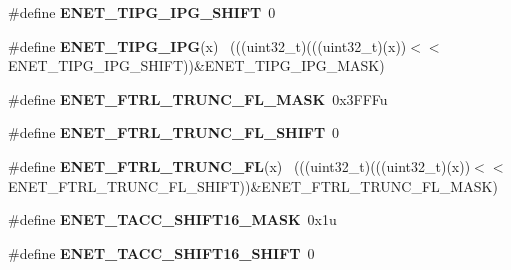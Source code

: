 \begin{DoxyCompactItemize}
\item 
\hypertarget{group___e_n_e_t___register___masks_gabab61fb9b318b0019d086418cc90f1f7}{}\#define {\bfseries E\+N\+E\+T\+\_\+\+T\+I\+P\+G\+\_\+\+I\+P\+G\+\_\+\+S\+H\+I\+F\+T}~0\label{group___e_n_e_t___register___masks_gabab61fb9b318b0019d086418cc90f1f7}

\item 
\hypertarget{group___e_n_e_t___register___masks_ga2660bb65651046d496b57ec5bcd298dd}{}\#define {\bfseries E\+N\+E\+T\+\_\+\+T\+I\+P\+G\+\_\+\+I\+P\+G}(x)                                              ~(((uint32\+\_\+t)(((uint32\+\_\+t)(x))$<$$<$E\+N\+E\+T\+\_\+\+T\+I\+P\+G\+\_\+\+I\+P\+G\+\_\+\+S\+H\+I\+F\+T))\&E\+N\+E\+T\+\_\+\+T\+I\+P\+G\+\_\+\+I\+P\+G\+\_\+\+M\+A\+S\+K)\label{group___e_n_e_t___register___masks_ga2660bb65651046d496b57ec5bcd298dd}

\item 
\hypertarget{group___e_n_e_t___register___masks_ga05457257c070632d99a2691b0859b4a9}{}\#define {\bfseries E\+N\+E\+T\+\_\+\+F\+T\+R\+L\+\_\+\+T\+R\+U\+N\+C\+\_\+\+F\+L\+\_\+\+M\+A\+S\+K}~0x3\+F\+F\+Fu\label{group___e_n_e_t___register___masks_ga05457257c070632d99a2691b0859b4a9}

\item 
\hypertarget{group___e_n_e_t___register___masks_gabde46c4ee41f8745b475d4d715455332}{}\#define {\bfseries E\+N\+E\+T\+\_\+\+F\+T\+R\+L\+\_\+\+T\+R\+U\+N\+C\+\_\+\+F\+L\+\_\+\+S\+H\+I\+F\+T}~0\label{group___e_n_e_t___register___masks_gabde46c4ee41f8745b475d4d715455332}

\item 
\hypertarget{group___e_n_e_t___register___masks_gab52ad379ca37c72f1c2eebad7be298fe}{}\#define {\bfseries E\+N\+E\+T\+\_\+\+F\+T\+R\+L\+\_\+\+T\+R\+U\+N\+C\+\_\+\+F\+L}(x)                                    ~(((uint32\+\_\+t)(((uint32\+\_\+t)(x))$<$$<$E\+N\+E\+T\+\_\+\+F\+T\+R\+L\+\_\+\+T\+R\+U\+N\+C\+\_\+\+F\+L\+\_\+\+S\+H\+I\+F\+T))\&E\+N\+E\+T\+\_\+\+F\+T\+R\+L\+\_\+\+T\+R\+U\+N\+C\+\_\+\+F\+L\+\_\+\+M\+A\+S\+K)\label{group___e_n_e_t___register___masks_gab52ad379ca37c72f1c2eebad7be298fe}

\item 
\hypertarget{group___e_n_e_t___register___masks_ga88e7d546b2d5198aaecb2755eeaca679}{}\#define {\bfseries E\+N\+E\+T\+\_\+\+T\+A\+C\+C\+\_\+\+S\+H\+I\+F\+T16\+\_\+\+M\+A\+S\+K}~0x1u\label{group___e_n_e_t___register___masks_ga88e7d546b2d5198aaecb2755eeaca679}

\item 
\hypertarget{group___e_n_e_t___register___masks_gad6be72a0d8613b7d2e2a173821caf724}{}\#define {\bfseries E\+N\+E\+T\+\_\+\+T\+A\+C\+C\+\_\+\+S\+H\+I\+F\+T16\+\_\+\+S\+H\+I\+F\+T}~0\label{group___e_n_e_t___register___masks_gad6be72a0d8613b7d2e2a173821caf724}


\end{DoxyCompactItemize}
